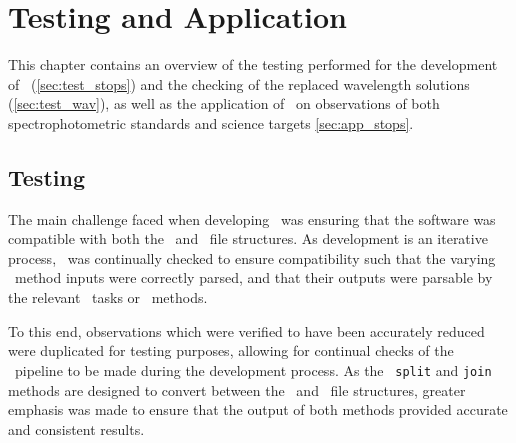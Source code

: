 \chapter{Testing and Application}

This chapter contains an overview of the testing performed for the development of \stops\ (\autoref{sec:test_stops}) and the checking of the replaced wavelength solutions (\autoref{sec:test_wav}), as well as the application of \stops\ on observations of both spectrophotometric standards and science targets \ref{sec:app_stops}.

\section[Testing \textsc{stops}]{Testing \stops} \label{sec:test_stops}

The main challenge faced when developing \stops\ was ensuring that the software was compatible with both the \polsalt\ and \iraf\ file structures. As development is an iterative process, \stops\ was continually checked to ensure compatibility such that the varying \stops\ method inputs were correctly parsed, and that their outputs were parsable by the relevant \iraf\ tasks or \polsalt\ methods.

To this end, observations which were verified to have been accurately reduced were duplicated for testing purposes, allowing for continual checks of the \stops\ pipeline to be made during the development process. As the \stops\ \texttt{split} and \texttt{join} methods are designed to convert between the \polsalt\ and \iraf\ file structures, greater emphasis was made to ensure that the output of both methods provided accurate and consistent results.



